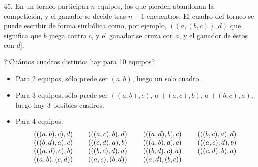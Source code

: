 \begin{problem}{45.}
	En un torneo participan $n$ equipos, los que pierden abandonan la competici\'on, y el ganador se decide tras $n-1$ encuentros.
	El cuadro del torneo se puede escribir de forma simb\'olica como, por ejemplo,  $((a,(b,c)),d)$ que significa que $b$ juega contra $c$, y el ganador se cruza con $a$, y el ganador de \'estos con $d$].

	?`Cu\'antos cuadros distintos hay para 10 equipos? 
	\begin{itemize}
		\item Para 2 equipos, s\'olo puede ser $(a,b)$, luego un solo cuadro.
		\item Para 3 equipos, s\'olo puede ser $((a,b),c)$, o $((a,c),b)$, o $((b,c),a)$, luego hay 3 posibles cuadros.
		\item Para 4 equipos:
			\begin{equation*}
				\begin{array}{@{}cccc@{}}
					(((a,b),c),d) & \quad\;(((a,c),b),d) & \quad\;(((a,d),b),c) & \quad\;(((b,c),a),d) \\
					(((b,d),a),c) & \quad\;(((c,d),a),b) & \quad\;(((a,b),d),c) & \quad\;(((a,c),d),b) \\ 
					(((a,d),c),b) & \quad\;(((b,c),d),a) & \quad\;(((b,d),c),a) & \quad\;(((c,d),b),a) \\
					((a,b),(c,d)) & \quad\;((a,c),(b,d)) & \quad\;((a,d),(b,c))
				\end{array}
			\end{equation*}
	\end{itemize}
\end{problem}

